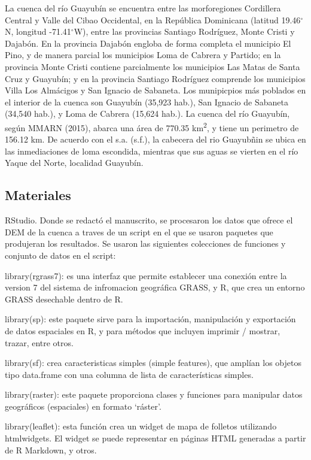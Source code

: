 \documentclass[11pt,]{article}
\begin{document}
La cuenca del río Guayubín se encuentra entre las morforegiones
Cordillera Central y Valle del Cibao Occidental, en la República
Dominicana (latitud 19.46\(^\circ\)N, longitud -71.41\(^\circ\)W), entre
las provincias Santiago Rodríguez, Monte Cristi y Dajabón. En la
provincia Dajabón engloba de forma completa el municipio El Pino, y de
manera parcial los municipios Loma de Cabrera y Partido; en la provincia
Monte Cristi contiene parcialmente los municipios Las Matas de Santa
Cruz y Guayubín; y en la provincia Santiago Rodríguez comprende los
municipios Villa Los Almácigos y San Ignacio de Sabaneta. Los
munipicpios más poblados en el interior de la cuenca son Guayubín
(35,923 hab.), San Ignacio de Sabaneta (34,540 hab.), y Loma de Cabrera
(15,624 hab.). La cuenca del río Guayubín, según MMARN (2015), abarca
una área de 770.35 km\textsuperscript{2}, y tiene un perimetro de 156.12
km. De acuerdo con el s.a. (s.f.), la cabecera del rio Guayubñin se
ubica en las inmediaciones de loma escondida, mientras que sus aguas se
vierten en el río Yaque del Norte, localidad Guayubín.

\subsection{Materiales}\label{materiales}

RStudio. Donde se redactó el manuscrito, se procesaron los datos que
ofrece el DEM de la cuenca a traves de un script en el que se usaron
paquetes que produjeran los resultados. Se usaron las siguientes
colecciones de funciones y conjunto de datos en el script:

library(rgrass7): es una interfaz que permite establecer una conexión
entre la version 7 del sistema de infromacion geográfica GRASS, y R, que
crea un entorno GRASS desechable dentro de R.

library(sp): este paquete sirve para la importación, manipulación y
exportación de datos espaciales en R, y para métodos que incluyen
imprimir / mostrar, trazar, entre otros.

library(sf): crea caracteristicas simples (simple features), que amplían
los objetos tipo data.frame con una columna de lista de características
simples.

library(raster): este paquete proporciona clases y funciones para
manipular datos geográficos (espaciales) en formato `ráster'.

library(leaflet): esta función crea un widget de mapa de folletos
utilizando htmlwidgets. El widget se puede representar en páginas HTML
generadas a partir de R Markdown, y otros.
\end{document}
